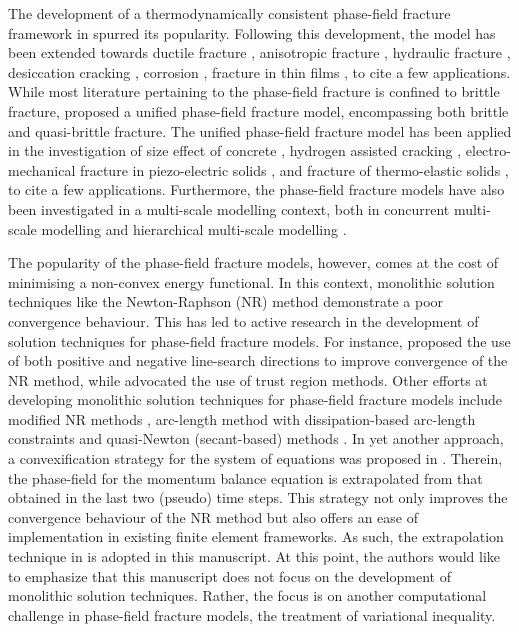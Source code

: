 \documentclass[11pt]{article}
\begin{document}
The development of a thermodynamically consistent phase-field fracture framework in \cite{miehe2010b} spurred its popularity. Following this development, the model has been extended towards ductile fracture \cite{miehe2015486,ambati2015ductile}, anisotropic fracture \cite{TEICHTMEISTER20171,BLEYER2018213}, hydraulic fracture \cite{WILSON2016264,HEIDER201738}, desiccation cracking \cite{cajuhi2018phase,HU2020113106}, corrosion \cite{MARTINEZPANEDA2018742,KRISTENSEN2020104093}, fracture in thin films \cite{Mesgarnejad2013}, to cite a few applications. While most literature pertaining to the phase-field fracture is confined to brittle fracture, \cite{wu2017} proposed a unified phase-field fracture model, encompassing both brittle and quasi-brittle fracture. The unified phase-field fracture model has been applied in the investigation of size effect of concrete \cite{FENG201866}, hydrogen assisted cracking \cite{WU2020112614}, electro-mechanical fracture in piezo-electric solids \cite{WU2021114125} , and fracture of thermo-elastic solids \cite{MANDAL2021113648}, to cite a few applications. Furthermore, the phase-field fracture models have also been investigated in a multi-scale modelling context, both in concurrent multi-scale modelling \cite{patil2019multiscale,gerasimov2018non,nguyen2019multiscale,triantafyllou2020generalized} and hierarchical multi-scale modelling \cite{he2020numerical,Bharali2021}.

The popularity of the phase-field fracture models, however, comes at the cost of minimising a non-convex energy functional. In this context, monolithic solution techniques like the Newton-Raphson (NR) method demonstrate a poor convergence behaviour. This has led to active research in the development of solution techniques for phase-field fracture models. For instance, \cite{Gerasimov2016} proposed the use of both positive and negative line-search directions to improve convergence of the NR method, while \cite{kopanivcakova2020recursive} advocated the use of trust region methods. Other efforts at developing monolithic solution techniques for phase-field fracture models include modified NR methods \cite{wick2017modified}, arc-length method with dissipation-based arc-length constraints \cite{vignollet2014phase,may2015numerical,singh2016fracture,BHARALI2022114927} and quasi-Newton (secant-based) methods \cite{WU2020112704,KRISTENSEN2020102446}. In yet another approach, a convexification strategy for the system of equations was proposed in \cite{Heister2015}. Therein, the phase-field for the momentum balance equation is extrapolated from that obtained in the last two (pseudo) time steps. This strategy not only improves the convergence behaviour of the NR method but also offers an ease of implementation in existing finite element frameworks. As such, the extrapolation technique in \cite{Heister2015} is adopted in this manuscript. At this point, the authors would like to emphasize that this manuscript does not focus on the development of monolithic solution techniques. Rather, the focus is on another computational challenge in phase-field fracture models, the treatment of variational inequality.
\end{document}
